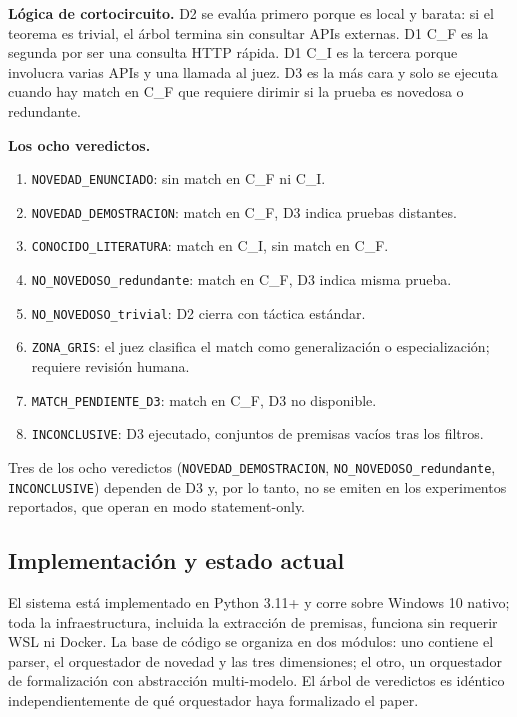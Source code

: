 \documentclass[12pt,a4paper]{article}
\theoremstyle{remark}
\begin{document}
\textbf{Lógica de cortocircuito.} D2 se evalúa primero porque es local y barata: si el teorema es trivial, el árbol termina sin consultar APIs externas. D1 C\_F es la segunda por ser una consulta HTTP rápida. D1 C\_I es la tercera porque involucra varias APIs y una llamada al juez. D3 es la más cara y solo se ejecuta cuando hay match en C\_F que requiere dirimir si la prueba es novedosa o redundante.

\textbf{Los ocho veredictos.}

\begin{enumerate}
\item \texttt{NOVEDAD\_ENUNCIADO}: sin match en C\_F ni C\_I.
\item \texttt{NOVEDAD\_DEMOSTRACION}: match en C\_F, D3 indica pruebas distantes.
\item \texttt{CONOCIDO\_LITERATURA}: match en C\_I, sin match en C\_F.
\item \texttt{NO\_NOVEDOSO\_redundante}: match en C\_F, D3 indica misma prueba.
\item \texttt{NO\_NOVEDOSO\_trivial}: D2 cierra con táctica estándar.
\item \texttt{ZONA\_GRIS}: el juez clasifica el match como generalización o especialización; requiere revisión humana.
\item \texttt{MATCH\_PENDIENTE\_D3}: match en C\_F, D3 no disponible.
\item \texttt{INCONCLUSIVE}: D3 ejecutado, conjuntos de premisas vacíos tras los filtros.
\end{enumerate}

Tres de los ocho veredictos (\texttt{NOVEDAD\_DEMOSTRACION}, \texttt{NO\_NOVEDOSO\_redundante}, \texttt{INCONCLUSIVE}) dependen de D3 y, por lo tanto, no se emiten en los experimentos reportados, que operan en modo statement-only.

\subsection{Implementación y estado actual}

El sistema está implementado en Python 3.11+ y corre sobre Windows 10 nativo; toda la infraestructura, incluida la extracción de premisas, funciona sin requerir WSL ni Docker. La base de código se organiza en dos módulos: uno contiene el parser, el orquestador de novedad y las tres dimensiones; el otro, un orquestador de formalización con abstracción multi-modelo. El árbol de veredictos es idéntico independientemente de qué orquestador haya formalizado el paper.
\end{document}
